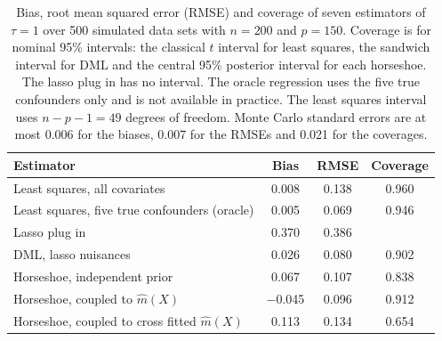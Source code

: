 \begin{table}[ht]
\centering
\small
\caption{Bias, root mean squared error (RMSE) and coverage of seven estimators of $\tau = 1$ over 500 simulated data sets with $n = 200$ and $p = 150$. Coverage is for nominal 95\% intervals: the classical $t$ interval for least squares, the sandwich interval for DML and the central 95\% posterior interval for each horseshoe. The lasso plug in has no interval. The oracle regression uses the five true confounders only and is not available in practice. The least squares interval uses $n - p - 1 = 49$ degrees of freedom. Monte Carlo standard errors are at most 0.006 for the biases, 0.007 for the RMSEs and 0.021 for the coverages.}
\label{tab:ric_hd150}
\begin{tabular}{@{}>{\raggedright\arraybackslash}p{2.3in}ccc@{}}
\toprule
Estimator & Bias & RMSE & Coverage \\
\midrule
Least squares, all covariates & 0.008 & 0.138 & 0.960 \\
Least squares, five true confounders (oracle) & 0.005 & 0.069 & 0.946 \\
Lasso plug in & 0.370 & 0.386 &  \\
DML, lasso nuisances & 0.026 & 0.080 & 0.902 \\
Horseshoe, independent prior & 0.067 & 0.107 & 0.838 \\
Horseshoe, coupled to $\hat m(X)$ & $-$0.045 & 0.096 & 0.912 \\
Horseshoe, coupled to cross fitted $\hat m(X)$ & 0.113 & 0.134 & 0.654 \\
\bottomrule
\end{tabular}
\end{table}
